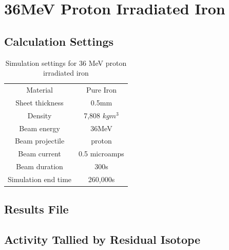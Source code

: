 \FloatBarrier
\clearpage
\section{36MeV Proton Irradiated Iron}
\label{appendix:ironirradiation}


\subsection{Calculation Settings}

\begin{table}[h]
\begin{center}
\begin{tabular}{c c}
\hline\hline
Material & Pure Iron \\
Sheet thickness & 0.5mm \\
Density & 7,808 $kg m^{3}$ \\
Beam energy & 36MeV \\
Beam projectile & proton \\
Beam current & 0.5 microamps \\
Beam duration & 300s \\
Simulation end time & 260,000s \\
\hline\hline
\end{tabular}
\end{center}
\caption{Simulation settings for 36 MeV proton irradiated iron}
\label{table:appendixironsettings}
\end{table}



\subsection{Results File}




\clearpage

\subsection{Activity Tallied by Residual Isotope}

\FloatBarrier


